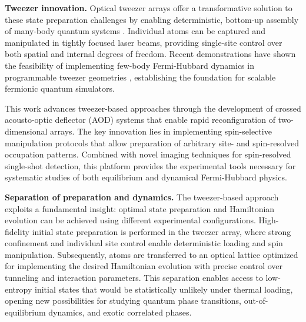 \textbf{Tweezer innovation.} Optical tweezer arrays offer a transformative solution to these state preparation challenges by enabling deterministic, bottom-up assembly of many-body quantum systems \cite{browaeys_many-body_2020}. Individual atoms can be captured and manipulated in tightly focused laser beams, providing single-site control over both spatial and internal degrees of freedom. Recent demonstrations have shown the feasibility of implementing few-body Fermi-Hubbard dynamics in programmable tweezer geometries \cite{spar_realization_2022,yan_two-dimensional_2022}, establishing the foundation for scalable fermionic quantum simulators.

This work advances tweezer-based approaches through the development of crossed acousto-optic deflector (AOD) systems that enable rapid reconfiguration of two-dimensional arrays. The key innovation lies in implementing spin-selective manipulation protocols that allow preparation of arbitrary site- and spin-resolved occupation patterns. Combined with novel imaging techniques for spin-resolved single-shot detection, this platform provides the experimental tools necessary for systematic studies of both equilibrium and dynamical Fermi-Hubbard physics.

\textbf{Separation of preparation and dynamics.} The tweezer-based approach exploits a fundamental insight: optimal state preparation and Hamiltonian evolution can be achieved using different experimental configurations. High-fidelity initial state preparation is performed in the tweezer array, where strong confinement and individual site control enable deterministic loading and spin manipulation. Subsequently, atoms are transferred to an optical lattice optimized for implementing the desired Hamiltonian evolution with precise control over tunneling and interaction parameters. This separation enables access to low-entropy initial states that would be statistically unlikely under thermal loading, opening new possibilities for studying quantum phase transitions, out-of-equilibrium dynamics, and exotic correlated phases.